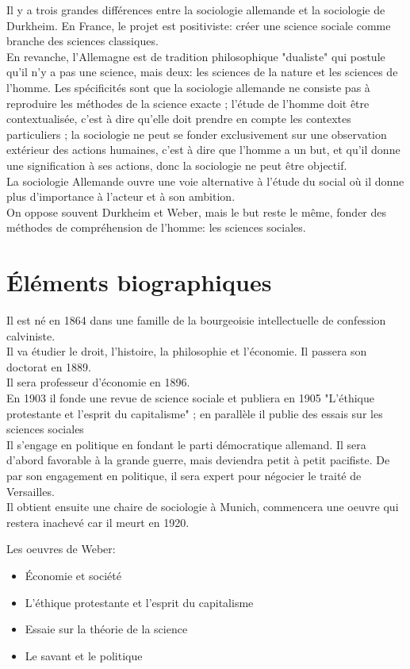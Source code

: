 \documentclass[10pt, a4paper, openany]{book}
\begin{document}
Il y a trois grandes différences entre la sociologie allemande et la sociologie de Durkheim. En France, le projet est positiviste: créer une science sociale comme branche des sciences classiques. \\
En revanche, l'Allemagne est de tradition philosophique "dualiste" qui postule qu'il n'y a pas une science, mais deux: les sciences de la nature et les sciences de l'homme. Les spécificités sont que la sociologie allemande ne consiste pas à reproduire les méthodes de la science exacte ; l'étude de l'homme doit être contextualisée, c'est à dire qu'elle doit prendre en compte les contextes particuliers ; la sociologie ne peut se fonder exclusivement sur une observation extérieur des actions humaines, c'est à dire que l'homme a un but, et qu'il donne une signification à ses actions, donc la sociologie ne peut être objectif. \\
La sociologie Allemande ouvre une voie alternative à l'étude du social où il donne plus d'importance à l'acteur et à son ambition. \\
On oppose souvent Durkheim et Weber, mais le but reste le même, fonder des méthodes de compréhension de l'homme: les sciences sociales.


\section{Éléments biographiques}

Il est né en 1864 dans une famille de la bourgeoisie intellectuelle de confession calviniste. \\
Il va étudier le droit, l'histoire, la philosophie et l'économie. Il passera son doctorat en 1889. \\
Il sera professeur d'économie en 1896. \\
En 1903 il fonde une revue de science sociale et publiera en 1905 "L'éthique protestante et l'esprit du capitalisme" ; en parallèle il publie des essais sur les sciences sociales \\
Il s'engage en politique en fondant le parti démocratique allemand. Il sera d'abord favorable à la grande guerre, mais deviendra petit à petit pacifiste. De par son engagement en politique, il sera expert pour négocier le traité de Versailles. \\
Il obtient ensuite une chaire de sociologie à Munich, commencera une oeuvre qui restera inachevé car il meurt en 1920.


Les oeuvres de Weber:
\begin{itemize}
\item Économie et société
\item L'éthique protestante et l'esprit du capitalisme
\item Essaie sur la théorie de la science
\item Le savant et le politique
\end{itemize}
\end{document}
